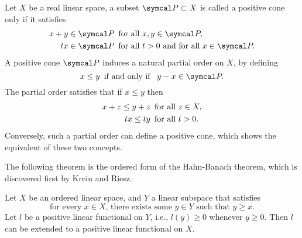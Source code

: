 \begin{definition}
  Let $X$ be a real linear space, a subset $\CONE P\subset X$ is called a positive cone only if it satisfies
  \begin{equation*}
    \begin{aligned}
      x+y\in\CONE P&\text{\enskip for all }x, y\in\CONE P,\\
      tx\in\CONE P&\text{\enskip for all }t>0 \text{ and for all }x\in\CONE P.
    \end{aligned}
  \end{equation*}
  A positive cone $\CONE P$ induces a natural partial order on $X$, by defining
  \begin{equation*}
    x\leq y \text{\enskip if and only if \enskip}y-x\in\CONE P.
  \end{equation*}
  The partial order satisfies that if $x\leq y$ then
  \begin{equation*}
    \begin{aligned}
      x+z\leq y+z&\text{\enskip for all }z\in X,\\
      tx\leq ty&\text{\enskip for all }t>0.
    \end{aligned}
  \end{equation*}
  Conversely, such a partial order can define a positive cone, which shows the equivalent of these two concepts.
\end{definition}

The following theorem is the ordered form of the Hahn-Banach theorem, which is discovered first by Krein and Riesz.

\begin{theorem}
  Let $X$ be an ordered linear space, and $Y$ a linear subspace that satisfies
  \begin{equation*}
    \text{for every }x\in X\text{, there exists some }y\in Y\text{ such that }y\geq x.
  \end{equation*}
  Let $l$ be a positive linear functional on $Y$, i.e., $l(y)\geq 0$ whenever $y\geq 0$. Then $l$ can be extended to a positive linear functional on $X$.
\end{theorem}

